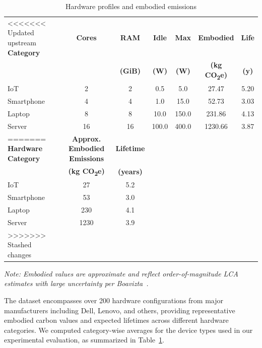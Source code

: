 \documentclass[10pt,journal,compsoc]{IEEEtran}
\begin{document}
\begin{table}[!t]
\centering
\caption{Hardware profiles and embodied emissions}
\label{t:hw_combined}
\setlength{\tabcolsep}{3pt}
\begin{tabular}{lcccccc}
\toprule
<<<<<<< Updated upstream
\textbf{Category} & \textbf{Cores} & \textbf{RAM} & \textbf{Idle} & \textbf{Max} & \textbf{Embodied} & \textbf{Life} \\
                  &                & \textbf{(GiB)} & \textbf{(W)}  & \textbf{(W)} & \textbf{(kg CO\textsubscript{2}e)} & \textbf{(y)} \\
\midrule
IoT               & 2              & 2              & 0.5           & 5.0          & 27.47  & 5.20 \\
Smartphone        & 4              & 4              & 1.0           & 15.0         & 52.73  & 3.03 \\
Laptop            & 8              & 8              & 10.0          & 150.0        & 231.86 & 4.13 \\
Server            & 16             & 16             & 100.0         & 400.0        & 1230.66& 3.87 \\
=======
\textbf{Hardware Category} & \textbf{Approx. Embodied Emissions} & \textbf{Lifetime} \\
                           & \textbf{(kg CO\textsubscript{2}e)} & \textbf{(years)} \\
\midrule
IoT                        & 27                         & 5.2 \\
Smartphone                 & 53                         & 3.0 \\
Laptop                     & 230                        & 4.1 \\
Server                     & 1230                       & 3.9 \\
>>>>>>> Stashed changes
\bottomrule
\end{tabular}
\vspace{2pt}
\emph{Note: Embodied values are approximate and reflect order-of-magnitude LCA estimates with large uncertainty per Boavizta~\cite{boavizta2023methodology,boavizta2023}.}
\end{table}

The dataset encompasses over 200 hardware configurations from major manufacturers including Dell, Lenovo, and others, providing representative embodied carbon values and expected lifetimes across different hardware categories. We computed category-wise averages for the device types used in our experimental evaluation, as summarized in Table~\ref{t:hw_combined}.
\end{document}
